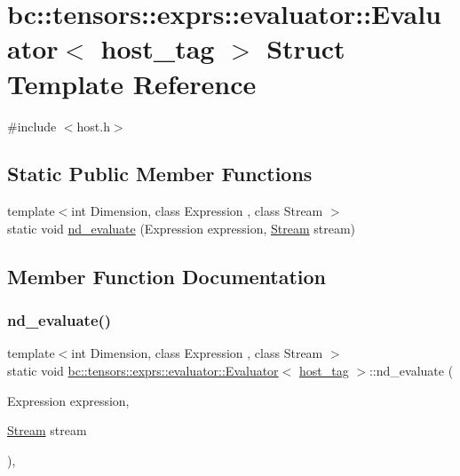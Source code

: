 \hypertarget{structbc_1_1tensors_1_1exprs_1_1evaluator_1_1Evaluator_3_01host__tag_01_4}{}\section{bc\+:\+:tensors\+:\+:exprs\+:\+:evaluator\+:\+:Evaluator$<$ host\+\_\+tag $>$ Struct Template Reference}
\label{structbc_1_1tensors_1_1exprs_1_1evaluator_1_1Evaluator_3_01host__tag_01_4}


{\ttfamily \#include $<$host.\+h$>$}

\subsection*{Static Public Member Functions}
\begin{DoxyCompactItemize}
\item 
{\footnotesize template$<$int Dimension, class Expression , class Stream $>$ }\\static void \hyperlink{structbc_1_1tensors_1_1exprs_1_1evaluator_1_1Evaluator_3_01host__tag_01_4_a2ce2ca9438311b975f1a5ae19e29e020}{nd\+\_\+evaluate} (Expression expression, \hyperlink{classbc_1_1streams_1_1Stream}{Stream} stream)
\end{DoxyCompactItemize}


\subsection{Member Function Documentation}
\mbox{\label{structbc_1_1tensors_1_1exprs_1_1evaluator_1_1Evaluator_3_01host__tag_01_4_a2ce2ca9438311b975f1a5ae19e29e020}} 
\subsubsection{\texorpdfstring{nd\+\_\+evaluate()}{nd\_evaluate()}}
{\footnotesize\ttfamily template$<$int Dimension, class Expression , class Stream $>$ \\
static void \hyperlink{structbc_1_1tensors_1_1exprs_1_1evaluator_1_1Evaluator}{bc\+::tensors\+::exprs\+::evaluator\+::\+Evaluator}$<$ \hyperlink{structbc_1_1host__tag}{host\+\_\+tag} $>$\+::nd\+\_\+evaluate (\begin{DoxyParamCaption}\item[{Expression}]{expression,  }\item[{\hyperlink{classbc_1_1streams_1_1Stream}{Stream}}]{stream }\end{DoxyParamCaption})\hspace{0.3cm}{\ttfamily [inline]}, {\ttfamily [static]}}




